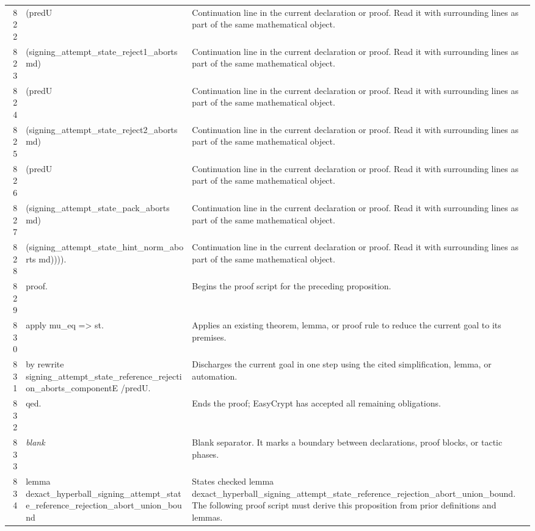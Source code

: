 \documentclass[10pt]{article}
\begin{document}
\begin{longtable}{r L{0.53\textwidth} L{0.37\textwidth}}
822 & {\ttfamily\scriptsize     (predU} & Continuation line in the current declaration or proof.  Read it with surrounding lines as part of the same mathematical object. \\
823 & {\ttfamily\scriptsize       (signing\_attempt\_state\_reject1\_aborts md)} & Continuation line in the current declaration or proof.  Read it with surrounding lines as part of the same mathematical object. \\
824 & {\ttfamily\scriptsize       (predU} & Continuation line in the current declaration or proof.  Read it with surrounding lines as part of the same mathematical object. \\
825 & {\ttfamily\scriptsize         (signing\_attempt\_state\_reject2\_aborts md)} & Continuation line in the current declaration or proof.  Read it with surrounding lines as part of the same mathematical object. \\
826 & {\ttfamily\scriptsize         (predU} & Continuation line in the current declaration or proof.  Read it with surrounding lines as part of the same mathematical object. \\
827 & {\ttfamily\scriptsize           (signing\_attempt\_state\_pack\_aborts md)} & Continuation line in the current declaration or proof.  Read it with surrounding lines as part of the same mathematical object. \\
828 & {\ttfamily\scriptsize           (signing\_attempt\_state\_hint\_norm\_aborts md)))).} & Continuation line in the current declaration or proof.  Read it with surrounding lines as part of the same mathematical object. \\
829 & {\ttfamily\scriptsize proof.} & Begins the proof script for the preceding proposition. \\
830 & {\ttfamily\scriptsize apply mu\_eq => st.} & Applies an existing theorem, lemma, or proof rule to reduce the current goal to its premises. \\
831 & {\ttfamily\scriptsize by rewrite signing\_attempt\_state\_reference\_rejection\_aborts\_componentE /predU.} & Discharges the current goal in one step using the cited simplification, lemma, or automation. \\
832 & {\ttfamily\scriptsize qed.} & Ends the proof; EasyCrypt has accepted all remaining obligations. \\
833 & {\ttfamily\scriptsize \emph{blank}} & Blank separator.  It marks a boundary between declarations, proof blocks, or tactic phases. \\
834 & {\ttfamily\scriptsize lemma dexact\_hyperball\_signing\_attempt\_state\_reference\_rejection\_abort\_union\_bound} & States checked lemma dexact\_hyperball\_signing\_attempt\_state\_reference\_rejection\_abort\_union\_bound.  The following proof script must derive this proposition from prior definitions and lemmas. \\

\end{longtable}
\end{document}
